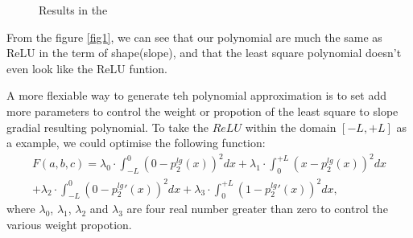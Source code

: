 \documentclass{article}
\theoremstyle{definition}
\begin{document}
\begin{figure}[ht]
\centering


\caption{ Results in the }
\label{fig2}
\end{figure}
From the figure \ref{fig1}, we can see that our polynomial are much the same as ReLU in the term of shape(slope), and that the least square polynomial doesn't even look like the ReLU funtion.

A more flexiable way to generate teh polynomial approximation is to set add more  parameters to control the weight or propotion of the least square to slope gradial resulting polynomial. To take the $ReLU$  within the domain $[-L, +L]$ as a example, we could optimise the following function:
\begin{equation*}
  \begin{aligned}
F(a, b, c)  =  \lambda_0 \cdot \int_{-L}^{0} (0 - p_2^{lg}(x))^2  dx 
             + \lambda_1 \cdot \int_{0}^{+L} (x - p_2^{lg}(x))^2  dx  \\
             + \lambda_2 \cdot \int_{-L}^{0} (0 - p_2^{lg}{'}(x))^2 dx 
             + \lambda_3 \cdot \int_{0}^{+L} (1 - p_2^{lg}{'}(x))^2 dx , 
 \end{aligned}
\end{equation*}
where $\lambda_0$, $\lambda_1$, $\lambda_2$ and $\lambda_3$ are four real number greater than zero to control the various weight propotion.
\end{document}
